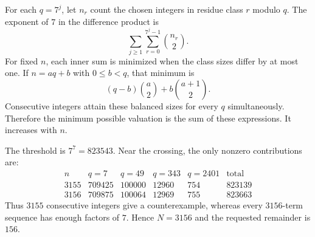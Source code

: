 For each $q=7^j$, let $n_r$ count the chosen integers in residue class $r$ modulo $q$. The exponent of $7$ in the difference product is
\[
\sum_{j\ge1}\sum_{r=0}^{7^j-1}\binom{n_r}{2}.
\]
For fixed $n$, each inner sum is minimized when the class sizes differ by at most one. If $n=aq+b$ with $0\le b<q$, that minimum is
\[
(q-b)\binom a2+b\binom{a+1}{2}.
\]
Consecutive integers attain these balanced sizes for every $q$ simultaneously. Therefore the minimum possible valuation is the sum of these expressions. It increases with $n$.

The threshold is $7^7=823543$. Near the crossing, the only nonzero contributions are:
\[
\begin{array}{c|rrrr|r}
n&q=7&q=49&q=343&q=2401&\text{total}\\\hline
3155&709425&100000&12960&754&823139\\
3156&709875&100064&12969&755&823663
\end{array}
\]
Thus $3155$ consecutive integers give a counterexample, whereas every $3156$-term sequence has enough factors of $7$. Hence $N=3156$ and the requested remainder is $\boxed{156}$.
